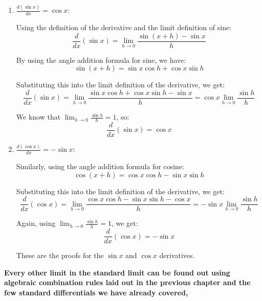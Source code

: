 \begin{enumerate}
    \item $\frac{d(\sin x)}{dx} = \cos x$:

\begin{outline}
    Using the definition of the derivative and the limit definition of sine:
\[
\frac{d}{dx}(\sin x) = \lim_{h \to 0} \frac{\sin(x+h) - \sin x}{h}
\]

By using the angle addition formula for sine, we have:
\[
\sin(x+h) = \sin x \cos h + \cos x \sin h
\]

Substituting this into the limit definition of the derivative, we get:
\[
\frac{d}{dx}(\sin x) = \lim_{h \to 0} \frac{\sin x \cos h + \cos x \sin h - \sin x}{h} = \cos x \lim_{h \to 0} \frac{\sin h}{h}
\]

We know that $\lim_{h \to 0} \frac{\sin h}{h} = 1$, so:
\[
\frac{d}{dx}(\sin x) = \cos x
\]

\end{outline}
\item  $\frac{d(\cos x)}{dx} = -\sin x$:

\begin{outline}
    Similarly, using the angle addition formula for cosine:
\[
\cos(x+h) = \cos x \cos h - \sin x \sin h
\]

Substituting this into the limit definition of the derivative, we get:
\[
\frac{d}{dx}(\cos x) = \lim_{h \to 0} \frac{\cos x \cos h - \sin x \sin h - \cos x}{h} = -\sin x \lim_{h \to 0} \frac{\sin h}{h}
\]

Again, using $\lim_{h \to 0} \frac{\sin h}{h} = 1$, we get:
\[
\frac{d}{dx}(\cos x) = -\sin x
\]

These are the proofs for the $\sin x$ and $\cos x$ derivatives.

\end{outline}
\end{enumerate}

\textbf{Every other limit in the standard limit can be found out using algebraic combination rules laid out in the previous chapter and the few standard differentials we have already covered, }


